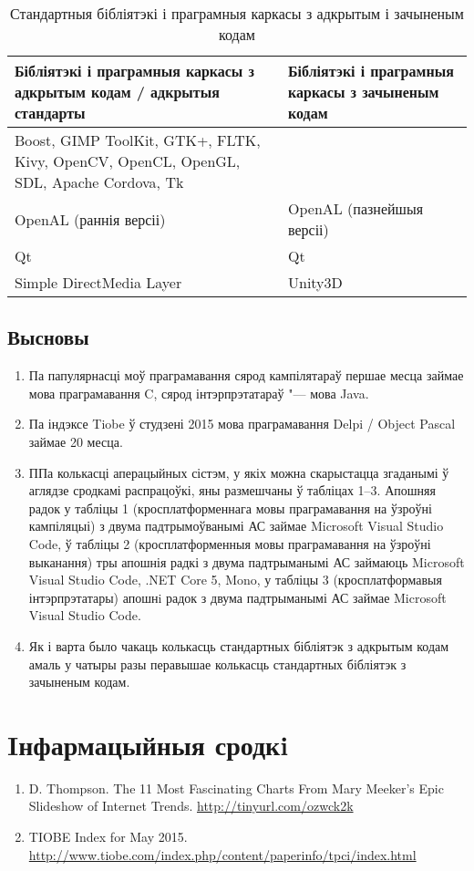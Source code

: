 \documentclass[10pt, a5paper]{article}
\begin{document}
\begin{table}
\caption{Стандартныя бібліятэкі і праграмныя каркасы з адкрытым і зачыненым кодам}
\label{z_table4}
  \centering
  \begin{tabular}{p{6cm} p{3.5cm}}
     \hline
    Бібліятэкі і праграмныя каркасы з адкрытым кодам / адкрытыя стандарты & Бібліятэкі і праграмныя каркасы з зачыненым кодам \\ \hline
    Boost, GIMP ToolKit, GTK+, FLTK, Kivy, OpenCV, OpenCL, OpenGL, SDL, Apache Cordova,  Tk &  \\
    OpenAL (раннія версіі) & OpenAL (пазнейшыя версіі) \\
    Qt & Qt \\
    Simple DirectMedia Layer & Unity3D \\ \hline
  \end{tabular}
\end{table}
\subsection*{Высновы}

\begin{enumerate}
  \item Па папулярнасці моў праграмавання сярод кампілятараў першае месца займае мова праграмавання C, сярод інтэрпрэтатараў "--- мова Java.
  \item Па індэксе Tiobe ў студзені 2015 мова праграмавання Delpi / Object Pascal займае 20 месца.
  \item ППа колькасці аперацыйных сістэм, у якіх можна скарыстацца згаданымі ў аглядзе сродкамі распрацоўкі, яны размешчаны ў табліцах 1--3. Апошняя радок у табліцы 1 (кросплатформеннага мовы праграмавання на ўзроўні кампіляцыі) з двума падтрымоўванымі АС займае Microsoft Visual Studio Code, ў табліцы 2 (кросплатформенныя мовы праграмавання на ўзроўні выканання) тры апошнія радкі з двума падтрыманымі АС займаюць Microsoft Visual Studio Code, .NET Core 5, Mono, у табліцы 3 (кросплатформавыя інтэрпрэтатары) апошнi радок з двума падтрыманымі АС займае Microsoft Visual Studio Code.
  \item Як і варта было чакаць колькасць стандартных бібліятэк з адкрытым кодам амаль у чатыры разы перавышае колькасць стандартных бібліятэк з зачыненым кодам.
\end{enumerate}

\section*{Iнфармацыйныя сродкi}

\begin{enumerate}
\item D. Thompson. The 11 Most Fascinating Charts From Mary Meeker's Epic Slideshow of Internet Trends. \url{http://tinyurl.com/ozwck2k}
\item TIOBE Index for May 2015. \url{http://www.tiobe.com/index.php/content/paperinfo/tpci/index.html} \end{enumerate}
\end{document}
